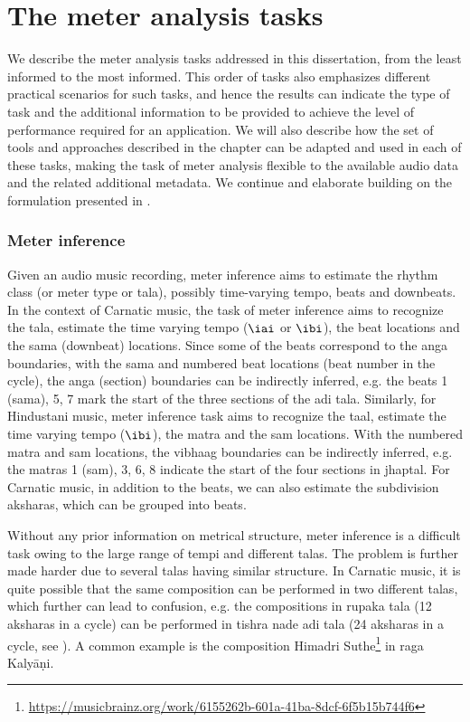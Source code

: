 \section{The meter analysis tasks}
We describe the meter analysis tasks addressed in this dissertation, from the least informed to the most informed. This order of tasks also emphasizes different practical scenarios for such tasks, and hence the results can indicate the type of task and the additional information to be provided to achieve the level of performance required for an application. We will also describe how the set of tools and approaches described in the chapter can be adapted and used in each of these tasks, making the task of meter analysis flexible to the available audio data and the related additional metadata. We continue and elaborate building on the formulation presented in . 
\subsubsection{Meter inference}
Given an audio music recording, meter inference aims to estimate the rhythm class (or meter type or \gls{tala}), possibly time-varying tempo, beats and downbeats. In the context of Carnatic music, the task of meter inference aims to recognize the \gls{tala}, estimate the time varying tempo ($\iai$ or $\ibi$), the beat locations and the \gls{sama} (downbeat) locations. Since some of the beats correspond to the \gls{anga} boundaries, with the \gls{sama} and numbered beat locations (beat number in the cycle), the \gls{anga} (section) boundaries can be indirectly inferred, e.g. the beats 1 (\gls{sama}), 5, 7 mark the start of the three sections of the \gls{adi} \gls{tala}. Similarly, for Hindustani music, meter inference task aims to recognize the \gls{taal}, estimate the time varying tempo ($\ibi$), the \gls{matra} and the \gls{sam} locations. With the numbered \gls{matra} and \gls{sam} locations, the \gls{vibhaag} boundaries can be indirectly inferred, e.g. the \glspl{matra} 1 (\gls{sam}), 3, 6, 8 indicate the start of the four sections in \gls{jhaptal}. For Carnatic music, in addition to the beats, we can also estimate the subdivision \glspl{akshara}, which can be grouped into beats. 

Without any prior information on metrical structure, meter inference is a difficult task owing to the large range of tempi and different \glspl{tala}. The problem is further made harder due to several \glspl{tala} having similar structure. In Carnatic music, it is quite possible that the same composition can be performed in two different \glspl{tala}, which further can lead to confusion, e.g. the compositions in \gls{rupaka} \gls{tala} (12 \glspl{akshara} in a cycle) can be performed in \gls{tishra} \gls{nade} \gls{adi} \gls{tala} (24 \glspl{akshara} in a cycle, see ). A common example is the composition Himadri Suthe\footnote{\url{https://musicbrainz.org/work/6155262b-601a-41ba-8dcf-6f5b15b744f6}} in \gls{raga} Kalyāṇi. 

